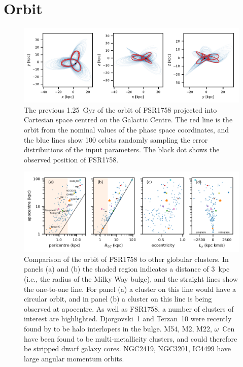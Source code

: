 \documentclass[fleqn,usenatbib,letters]{mnras}
\begin{document}
\section{Orbit}\label{sec:orbit}

\begin{figure}
	\includegraphics[width=\textwidth]{figures/orbit.pdf}
    \caption{The previous 1.25~Gyr of the orbit of FSR1758 projected into Cartesian space centred on the Galactic Centre. The red line is the orbit from the nominal values of the phase space coordinates, and the blue lines show 100 orbits randomly sampling the error distributions of the input parameters. The black dot shows the observed position of FSR1758.}
    \label{fig:orbit}
\end{figure}

\begin{figure}
	\includegraphics[width=\textwidth]{figures/orbit_comparison.pdf}
    \caption{Comparison of the orbit of FSR1758 to other globular clusters. In panels (a) and (b) the shaded region indicates a distance of 3~kpc (i.e., the radius of the Milky Way bulge), and the straight lines show the one-to-one line. For panel (a) a cluster on this line would have a circular orbit, and in panel (b) a cluster on this line is being observed at apocentre. As well as FSR1758, a number of clusters of interest are highlighted. Djorgovski~1 and Terzan~10 were recently found by \citet{Ortolani2019} to be halo interlopers in the bulge. M54, M2, M22, $\omega$~Cen have been found to be multi-metallicity clusters, and could therefore be stripped dwarf galaxy cores. NGC2419, NGC3201, IC4499 have large angular momentum orbits.}
    \label{fig:orbit_comparison.pdf}
\end{figure}
\end{document}
